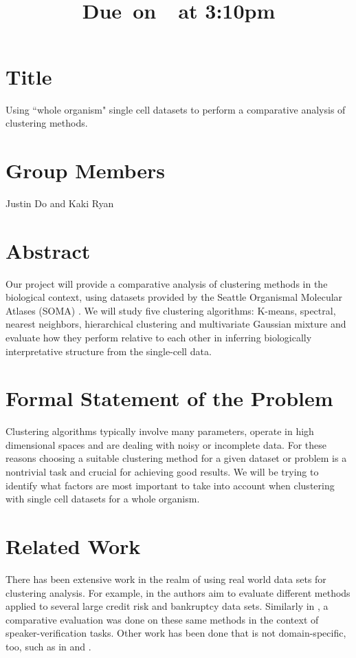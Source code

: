 \documentclass{article}
\title{
    \vspace{2in}
    \textmd{\textbf{\hmwkClass\hmwkTitle}}\\
    \normalsize\vspace{0.1in}\small{Due\ on\ \hmwkDueDate\ at 3:10pm}\\
    \vspace{3in}
}
\author{\hmwkAuthorName}
\date{}
\begin{document}


\section{Title}

Using ``whole organism" single cell datasets to perform a comparative analysis of clustering methods.

\section{Group Members}

Justin Do and Kaki Ryan

\section{Abstract}

 Our project will provide a comparative analysis of clustering methods in the biological context, using  datasets provided by the Seattle Organismal Molecular Atlases (SOMA) \cite{b1}. We will study five clustering algorithms: K-means, spectral, nearest neighbors, hierarchical clustering and multivariate Gaussian mixture and evaluate how they perform relative to each other in inferring biologically interpretative structure from the single-cell data.

\section{Formal Statement of the Problem}

Clustering algorithms typically involve many parameters, operate in high dimensional spaces and are dealing with noisy or incomplete data. For these reasons choosing a suitable clustering method for a given dataset or problem is a nontrivial task and crucial for achieving good results. We will be trying to identify what factors are most important to take into account when clustering with single cell datasets for a whole organism. 

\section{Related Work}
There has been extensive work in the realm of using real world data sets for clustering analysis. For example, in \cite{b5} the authors aim to evaluate different methods applied to several large credit risk and bankruptcy data sets. Similarly in \cite{b6}, a comparative evaluation was done on these same methods in the context of speaker-verification tasks. Other work has been done that is not domain-specific, too, such as in \cite{b4} and \cite{b7}.
\end{document}
